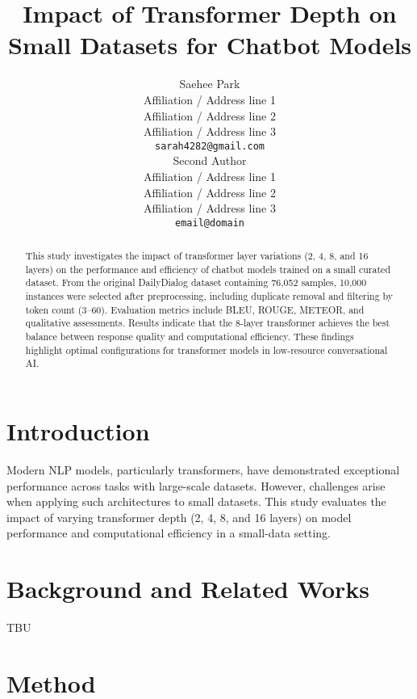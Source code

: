 \documentclass[11pt]{article}
\title{Impact of Transformer Depth on Small Datasets for Chatbot Models}
\author{Saehee Park\\
  Affiliation / Address line 1 \\
  Affiliation / Address line 2 \\
  Affiliation / Address line 3 \\
  \texttt{sarah4282@gmail.com} \\\And
  Second Author \\
  Affiliation / Address line 1 \\
  Affiliation / Address line 2 \\
  Affiliation / Address line 3 \\
  \texttt{email@domain} \\}
\begin{document}
\maketitle
\begin{abstract}
This study investigates the impact of transformer layer variations (2, 4, 8, and 16 layers) on the performance and efficiency of chatbot models trained on a small curated dataset. From the original DailyDialog dataset containing 76,052 samples, 10,000 instances were selected after preprocessing, including duplicate removal and filtering by token count (3–60). Evaluation metrics include BLEU, ROUGE, METEOR, and qualitative assessments. Results indicate that the 8-layer transformer achieves the best balance between response quality and computational efficiency. These findings highlight optimal configurations for transformer models in low-resource conversational AI.
\end{abstract}

\section{Introduction}

Modern NLP models, particularly transformers, have demonstrated exceptional performance across tasks with large-scale datasets. However, challenges arise when applying such architectures to small datasets. This study evaluates the impact of varying transformer depth (2, 4, 8, and 16 layers) on model performance and computational efficiency in a small-data setting.


\section{Background and Related Works}
TBU

\section{Method}
\end{document}
